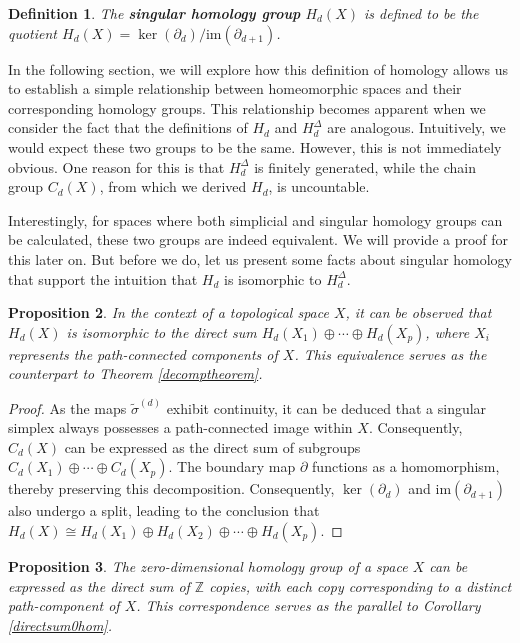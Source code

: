 \documentclass{amsart}
\newtheorem{definition}{Definition}[section]
\newtheorem{proposition}[definition]{Proposition}
\begin{document}
\begin{definition}
The \textbf{singular homology group} $H_d(X)$ is defined to be the quotient $H_d(X) = \ker(\partial_d) / \text{im}(\partial_{d+1})$.
\end{definition}

In the following section, we will explore how this definition of homology allows us to establish a simple relationship between homeomorphic spaces and their corresponding homology groups. This relationship becomes apparent when we consider the fact that the definitions of $H_d$ and $H^\Delta_d$ are analogous. Intuitively, we would expect these two groups to be the same. However, this is not immediately obvious. One reason for this is that $H^\Delta_d$ is finitely generated, while the chain group $C_d(X)$, from which we derived $H_d$, is uncountable.

Interestingly, for spaces where both simplicial and singular homology groups can be calculated, these two groups are indeed equivalent. We will provide a proof for this later on. But before we do, let us present some facts about singular homology that support the intuition that $H_d$ is isomorphic to $H^\Delta_d$.

\begin{proposition}
In the context of a topological space $X$, it can be observed that $H_d(X)$ is isomorphic to the direct sum $H_d(X_1) \oplus \cdots \oplus H_d(X_p)$, where $X_i$ represents the path-connected components of $X$. This equivalence serves as the counterpart to Theorem \ref{decomptheorem}.\end{proposition}

\begin{proof}
As the maps $\tilde{\sigma}^{(d)}$ exhibit continuity, it can be deduced that a singular simplex always possesses a path-connected image within $X$. Consequently, $C_d(X)$ can be expressed as the direct sum of subgroups $C_d(X_1) \oplus \cdots \oplus C_d(X_p)$. The boundary map $\partial$ functions as a homomorphism, thereby preserving this decomposition. Consequently, $\ker(\partial_d)$ and $\text{im}(\partial_{d+1})$ also undergo a split, leading to the conclusion that $H_d(X) \cong H_d(X_1) \oplus H_d(X_2) \oplus \cdots \oplus H_d(X_p)$.
\end{proof}


\begin{proposition}
The zero-dimensional homology group of a space $X$ can be expressed as the direct sum of $\mathbb{Z}$ copies, with each copy corresponding to a distinct path-component of $X$. This correspondence serves as the parallel to Corollary \ref{directsum0hom}.\end{proposition}
\end{document}
